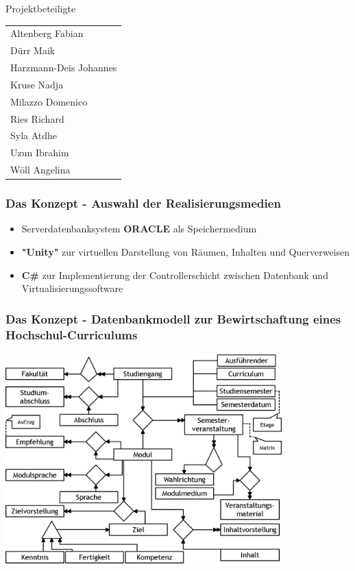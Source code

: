 \documentclass{beamer}
\newcommand{\tabitem}{%
  \usebeamertemplate{itemize item}\hspace*{\labelsep}}
\begin{document}

\begin{frame}{Projektbeteiligte}


 \begin{center}
    \begin{tabular}{@{}l@{}}
      \tabitem Altenberg Fabian \\
	  \tabitem Dürr Maik \\
	  \tabitem Harzmann-Deis Johannes \\
	  \tabitem Kruse Nadja \\
	  \tabitem Milazzo Domenico \\
	  \tabitem Ries Richard \\
	  \tabitem Syla Atdhe \\
	  \tabitem Uzun Ibrahim \\
	  \tabitem Wöll Angelina
    \end{tabular}
  \end{center}

\end{frame}



\begin{frame}
\frametitle{Das Konzept - Auswahl der Realisierungsmedien}
\begin{itemize}
\item Serverdatenbanksystem \textbf{ORACLE} als Speichermedium
\item \textbf{"Unity"} zur virtuellen Darstellung von Räumen, Inhalten und Querverweisen 
\item \textbf{C\#} zur Implementierung der Controllerschicht zwischen Datenbank und Virtualisierungssoftware
\end{itemize}
\end{frame}



\begin{frame}
\frametitle{Das Konzept - Datenbankmodell zur Bewirtschaftung eines Hochschul-Curriculums}
\begin{center}
\includegraphics[width=0.8\textwidth]{pictures/Datenmodell_Viculum.png}
\end{center}
\end{frame}
\end{document}
